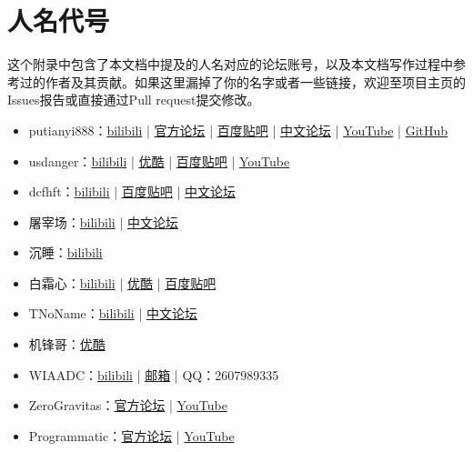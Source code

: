\chapter{人名代号}
这个附录中包含了本文档中提及的人名对应的论坛账号，以及本文档写作过程中参考过的作者及其贡献。如果这里漏掉了你的名字或者一些链接，欢迎至项目主页的Issues报告或直接通过Pull request提交修改。
\begin{itemize}
\item putianyi888：\href{https://space.bilibili.com/34937101}{bilibili} | \href{https://forums.terraria.org/index.php?members/putianyi888.121300/}{官方论坛} | \href{http://tieba.baidu.com/home/main?un=putianyi888}{百度贴吧} | \href{https://www.bbstr.net/members/putianyi888.342/}{中文论坛} | \href{https://www.youtube.com/channel/UCsG1EimffDYWXBoZRekcMIA}{YouTube} | \href{https://github.com/putianyi889}{GitHub}
\item usdanger：\href{https://space.bilibili.com/34637318/}{bilibili} | \href{http://i.youku.com/u/UMTcyMDA1MTY4}{优酷} | \href{http://tieba.baidu.com/home/main?un=us_danger}{百度贴吧} | \href{https://www.youtube.com/channel/UCh_cLX4iAbM6tAIl0zu3elw}{YouTube}
\item dcfhft：\href{https://space.bilibili.com/98605295/}{bilibili} | \href{http://tieba.baidu.com/home/main?un=dcfhft}{百度贴吧} | \href{https://www.bbstr.net/members/dcfhft.135/}{中文论坛}
\item 屠宰场：\href{https://space.bilibili.com/35610991/}{bilibili} | \href{https://www.bbstr.net/members/room.357/}{中文论坛}
\item 沉睡：\href{https://space.bilibili.com/22871583/}{bilibili}
\item 白霜心：\href{https://space.bilibili.com/49886444/}{bilibili} | \href{http://i.youku.com/u/UMTMyOTg1ODM4OA}{优酷} | \href{http://tieba.baidu.com/home/main?un=白霜心}{百度贴吧}
\item TNoName：\href{https://space.bilibili.com/14462041/}{bilibili} | \href{https://www.bbstr.net/members/tnoname.423/}{中文论坛}
\item 机锋哥：\href{http://i.youku.com/u/UMjg3MTI2NDcwOA}{优酷}
\item WIAADC：\href{https://space.bilibili.com/398780730}{bilibili} | \href{mailto:williamadcakc@outlook.com}{邮箱} | QQ：2607989335
\item ZeroGravitas：\href{https://forums.terraria.org/index.php?members/zerogravitas.96/}{官方论坛} | \href{https://www.youtube.com/channel/UCyLQbVwYleCYzgl49dNAeOw}{YouTube}
\item Programmatic：\href{https://forums.terraria.org/index.php?members/programmatic.37545/}{官方论坛} | \href{https://www.youtube.com/channel/UCWGTYKTR5Kw3cDhyd2vIDew}{YouTube}

\end{itemize}
